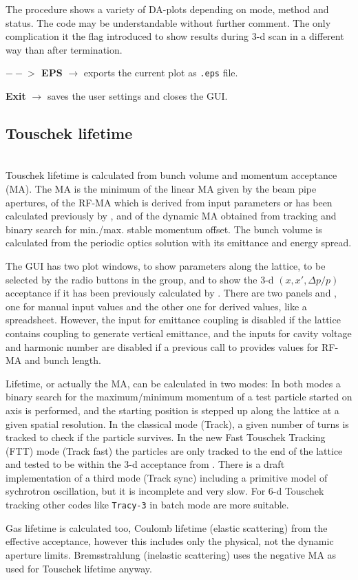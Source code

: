 \documentclass[12pt]{article}
\newcommand\code[1]{{\tt #1}}
\newcommand{\ofld}[1]{\colorbox{black!15}{{{\color{black}\bf #1}}}}
\newcommand{\ofldx}[1]{\colorbox{black!15}{{\color{black}(#1)}}}
\newcommand\guico[1]{{\color{blue}\code{#1}}}
\newcommand{\evcod}[2]{\ofld{#1} $\rightarrow$ \guico{#2}}
\newcommand{\opagui}[1]{\colorbox{blue!20}{{\color{black}\code{#1}}}}
\newcommand{\oguih}[2]{\subsection{\label{#2}#1}{\Huge\opagui{#2}}\\}
\newcommand{\ogui}[1]{\hyperref[#1]{\opagui{#1}}}
\newcommand{\desc}[1]{#1}
\newcommand{\todo}[1]{{\color{red} #1}}
\begin{document}
The \guico{MakePlot} procedure shows a variety of DA-plots depending on mode, method and status. The code may be understandable without further comment. The only complication it the flag \guico{MonitorXXP} introduced to show results during 3-d scan in a different way than after termination. 

\evcod{$--\!\!>$ EPS}{butExportClick} exports the current plot as \code{.eps} file.

\evcod{Exit}{Exit} saves the user settings and closes the GUI.





\oguih{Touschek lifetime}{opatracktt} 

\desc{Touschek lifetime is calculated from bunch volume and momentum acceptance (MA). The MA is the minimum of the linear MA given by the beam pipe apertures, of the RF-MA which is derived from input parameters or has been calculated previously by \ogui{opabucket}, and of the dynamic MA obtained from tracking and binary search for min./max. stable momentum offset. The bunch volume is calculated from the periodic optics solution with its emittance and energy spread.

The GUI has two plot windows, \guico{fig} to show parameters along the lattice, to be selected by the radio buttons in the \guico{rgshow} group, and \guico{flofig} to show the 3-d $(x,x',\Delta p/p)$ acceptance if it has been previously calculated by \ogui{opatrackda}. There are two panels \guico{panin} and \guico{panot}, one for manual input values and the other one for derived values, like a spreadsheet. However, the input for emittance coupling is disabled if the lattice contains coupling to generate vertical emittance, and the inputs for cavity voltage and harmonic number are disabled if a previous call to \ogui{opabucket} provides values for RF-MA and bunch length.

Lifetime, or actually the MA, can be calculated in two modes: In both modes a binary search for the maximum/minimum momentum of a test particle started on axis is performed, and the starting position is stepped up along the lattice at a given spatial resolution. In the classical mode \ofldx{Track}, a given number of turns is tracked to check if the particle survives. In the new Fast Touschek Tracking (FTT) mode \cite{FTTpaper} \ofldx{Track fast} the particles are only tracked to the end of the lattice and tested to be within the 3-d acceptance from \ogui{opatrackda}. \todo{There is a draft implementation of a third mode \ofldx{Track sync} including a primitive model of sychrotron oscillation, but it is incomplete and very slow. For 6-d Touschek tracking other codes like \code{Tracy-3} in batch mode are more suitable.}

Gas lifetime is calculated too, Coulomb lifetime (elastic scattering) from the effective acceptance, \todo{however this includes only the physical, not the dynamic aperture limits.} Bremsstrahlung (inelastic scattering) uses the negative MA as used for Touschek lifetime anyway.
} 
\end{document}
